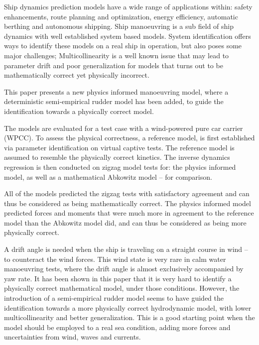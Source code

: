 Ship dynamics prediction models have a wide range of applications within: safety enhancements, route planning and optimization, energy efficiency, automatic berthing and autonomous shipping.
Ship manoeuvring is a sub field of ship dynamics with well established system based models.
System identification offers ways to identify these models on a real ship in operation, but also poses some major challenges;
Multicollinearity is a well known issue that may lead to parameter drift and poor generalization for models that turns out to be  mathematically correct yet physically incorrect.

This paper presents a new physics informed manoeuvring model, where a deterministic semi-empirical rudder model has been added, to guide the identification towards a physically correct model. 

The models are evaluated for a test case with a wind-powered pure car carrier (WPCC).
To assess the physical correctness, a reference model, is first established via parameter identification on virtual captive tests. The reference model is assumed to resemble the physically correct kinetics.  
The inverse dynamics regression is then conducted on zigzag model tests for: the physics informed model, as well as a mathematical Abkowitz model -- for comparison. 

All of the models predicted the zigzag tests with satisfactory agreement and can thus be considered as being mathematically correct. The physics informed model predicted forces and moments that were much more in agreement to the reference model than the Abkowitz model did, and can thus be considered as being more physically correct. 

A drift angle is needed when the ship is traveling on a straight course in wind -- to counteract the wind forces. This wind state is very rare in calm water manoeuvring tests, where the drift angle is almost exclusively accompanied by yaw rate. It has been shown in this paper that it is very hard to identify a physically correct mathematical model, under those conditions.
However, the introduction of a semi-empirical rudder model seems to have guided the identification towards a more physically correct hydrodynamic model, with lower multicollinearity and better generalization. This is a good starting point when the model should be employed to a real sea condition, adding more forces and uncertainties from wind, waves and currents.